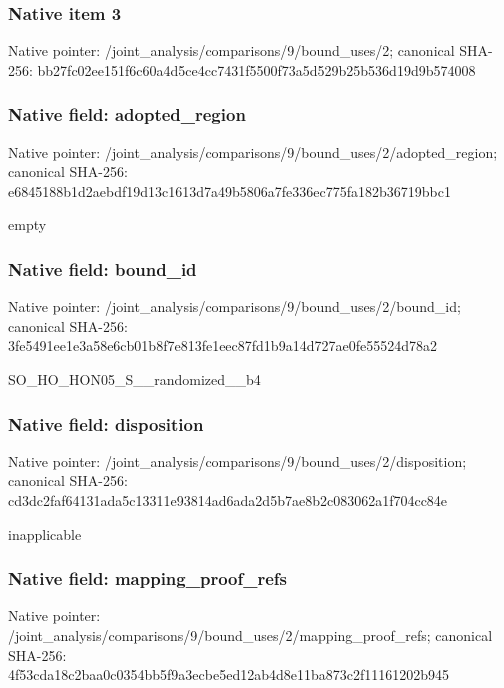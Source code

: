 \documentclass[10pt,a4paper]{article}
\begin{document}
\subsubsection{Native item 3}
Native pointer: /joint\_\allowbreak{}analysis/comparisons/9/bound\_\allowbreak{}uses/2; canonical SHA-256: bb27fc02ee151f6c60a4d5ce4cc7431f5500f73a5d529b25b536d19d9b574008

\subsubsection{Native field: adopted\_\allowbreak{}region}
Native pointer: /joint\_\allowbreak{}analysis/comparisons/9/bound\_\allowbreak{}uses/2/adopted\_\allowbreak{}region; canonical SHA-256: e6845188b1d2aebdf19d13c1613d7a49b5806a7fe336ec775fa182b36719bbc1

\begingroup\raggedright\sloppy empty\par\endgroup

\subsubsection{Native field: bound\_\allowbreak{}id}
Native pointer: /joint\_\allowbreak{}analysis/comparisons/9/bound\_\allowbreak{}uses/2/bound\_\allowbreak{}id; canonical SHA-256: 3fe5491ee1e3a58e6cb01b8f7e813fe1eec87fd1b9a14d727ae0fe55524d78a2

\begingroup\raggedright\sloppy SO\_\allowbreak{}HO\_\allowbreak{}HON05\_\allowbreak{}S\_\allowbreak{}\_\allowbreak{}randomized\_\allowbreak{}\_\allowbreak{}b4\par\endgroup

\subsubsection{Native field: disposition}
Native pointer: /joint\_\allowbreak{}analysis/comparisons/9/bound\_\allowbreak{}uses/2/disposition; canonical SHA-256: cd3dc2faf64131ada5c13311e93814ad6ada2d5b7ae8b2c083062a1f704cc84e

\begingroup\raggedright\sloppy inapplicable\par\endgroup

\subsubsection{Native field: mapping\_\allowbreak{}proof\_\allowbreak{}refs}
Native pointer: /joint\_\allowbreak{}analysis/comparisons/9/bound\_\allowbreak{}uses/2/mapping\_\allowbreak{}proof\_\allowbreak{}refs; canonical SHA-256: 4f53cda18c2baa0c0354bb5f9a3ecbe5ed12ab4d8e11ba873c2f11161202b945
\end{document}
